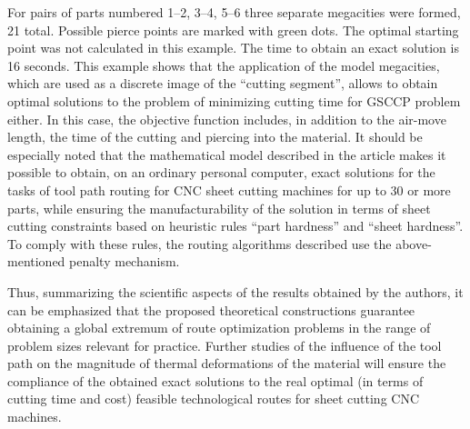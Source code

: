\documentclass[10pt]{article}
\begin{document}
For pairs of parts numbered 1--2, 3--4, 5--6
three separate megacities were formed,
21 total.
Possible pierce points are marked with green dots.
The optimal starting point was not calculated in this example.
The time to obtain an exact solution is 16 seconds.
This example shows that the application of the model megacities,
which are used as a discrete image of the ``cutting segment'',
allows to obtain optimal solutions to the problem of
minimizing cutting time for GSCCP problem either.
In this case,
the objective function includes,
in addition to the air-move length,
the time of the cutting and piercing into the material.
It should be especially noted
that the mathematical model described in the article
makes it possible to obtain,
on an ordinary personal computer,
exact solutions for the tasks of tool path routing for CNC sheet cutting machines
for up to 30 or more parts,
while ensuring the manufacturability of the solution in terms of sheet cutting constraints based on heuristic rules
``part hardness'' and
``sheet hardness''.
To comply with these rules,
the routing algorithms described
use the above-mentioned penalty mechanism.

Thus,
summarizing the scientific aspects of the results obtained by the authors,
it can be emphasized that the proposed
theoretical constructions guarantee obtaining a global extremum
of route optimization problems
in the range of problem sizes relevant for practice.
Further studies of the influence of the tool path on
the magnitude of thermal deformations of the material will ensure
the compliance of the obtained exact solutions
to the real optimal
(in terms of cutting time and cost)
feasible technological routes
for sheet cutting CNC machines.

% 
% 
\end{document}
